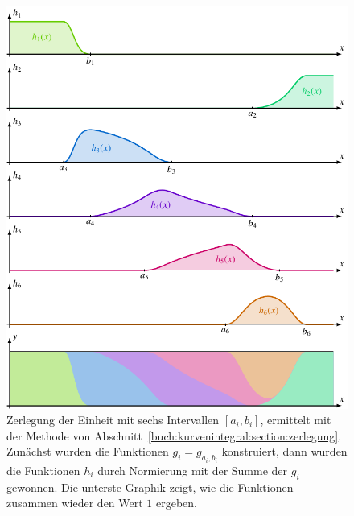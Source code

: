 %
%
%
\begin{figure}
\centering
\includegraphics{chapters/030-kurvenintegral/images/zerlegung.pdf}
\caption{Zerlegung der Einheit mit sechs Intervallen $[a_i,b_i]$,
ermittelt mit der Methode von
Abschnitt~\ref{buch:kurvenintegral:section:zerlegung}.
Zunächst wurden die Funktionen $g_i = g_{a_i,b_i}$ konstruiert, dann
wurden die Funktionen $h_i$ durch Normierung mit der Summe der $g_i$
gewonnen.
Die unterste Graphik zeigt, wie die Funktionen zusammen wieder den
Wert $1$ ergeben.
\label{buch:kurvenintegral:fig:zerlegung}}
\end{figure}

